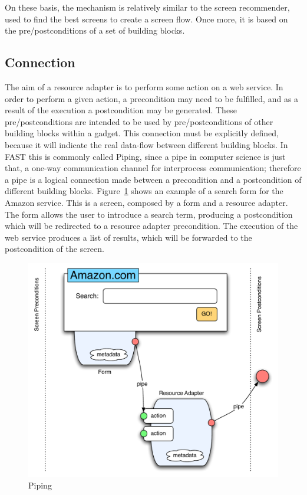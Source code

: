 \documentclass{fast_latex}
\begin{document}
On these basis, the mechanism is relatively similar to the screen recommender, used to find the best screens to create a screen flow. Once more, it is based on the pre/postconditions of a set of building blocks.


\subsection{Connection} %
\label{sub:connection}

The aim of a resource adapter is to perform some action on a web service. In order to perform a given action, a precondition may need to be fulfilled, and as a result of the execution a postcondition may be generated. These pre/postconditions are intended to be used by pre/postconditions of other building blocks within a gadget. This connection must be explicitly defined, because it will indicate the real data-flow between different building blocks. In FAST this is commonly called Piping, since a pipe in computer science is just that, a one-way communication channel for interprocess communication; therefore a pipe is a logical connection made between a precondition and a postcondition of different building blocks. Figure~\ref{fig:Piping} shows an example of a search form for the Amazon service. This is a screen, composed by a form and a resource adapter. The form allows the user to introduce a search term, producing a postcondition which will be redirected to a resource adapter precondition. The execution of the web service produces a list of results, which will be forwarded to the postcondition of the screen.

\begin{figure}[!htb]
  \begin{center}
    \includegraphics[width=12cm]{images/piping.pdf}
    \caption{Piping}
    \label{fig:Piping}
  \end{center}
\end{figure}
\end{document}
